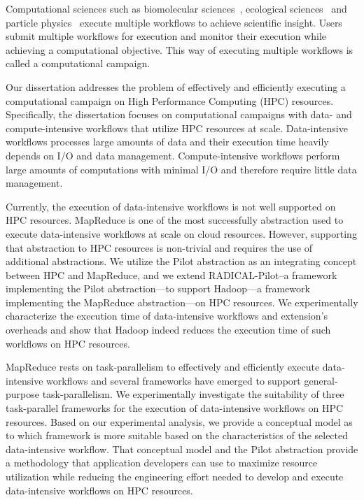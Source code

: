 Computational sciences such as biomolecular sciences~\cite{cheatham2015impact,
dakka2018concurrent}, ecological sciences~\cite{goncalves2020sealnet,
paraskevakos2019workflow} and particle physics~\cite{atlas} execute multiple
workflows to achieve scientific insight. Users submit multiple workflows for
execution and monitor their execution while achieving a computational objective.
This way of executing multiple workflows is called a computational campaign.

Our dissertation addresses the problem of effectively and efficiently executing
a computational campaign on High Performance Computing (HPC) resources.
Specifically, the dissertation focuses on computational campaigns with data- and
compute-intensive workflows that utilize HPC resources at scale. Data-intensive
workflows processes large amounts of data and their execution time heavily
depends on I/O and data management. Compute-intensive workflows perform large
amounts of computations with minimal I/O and therefore require little data
management.

Currently, the execution of data-intensive workflows is not well supported on
HPC resources. MapReduce is one of the most successfully abstraction used to
execute data-intensive workflows at scale on cloud resources. However,
supporting that abstraction to HPC resources is non-trivial and requires the
use of additional abstractions. We utilize the Pilot abstraction as an
integrating concept between HPC and MapReduce, and we extend RADICAL-Pilot--a
framework implementing the Pilot abstraction---to support Hadoop---a framework
implementing the MapReduce abstraction---on HPC resources. We experimentally
characterize the execution time of data-intensive workflows and extension's
overheads and show that Hadoop indeed reduces the execution time of such
workflows on HPC resources.


MapReduce rests on task-parallelism to effectively and efficiently execute
data-intensive workflows and several frameworks have emerged to support
general-purpose task-parallelism. We experimentally investigate the suitability
of three task-parallel frameworks for the execution of data-intensive workflows
on HPC resources. Based on our experimental analysis, we provide a conceptual
model as to which framework is more suitable based on the characteristics of the
selected data-intensive workflow. That conceptual model and the Pilot
abstraction provide a methodology that application developers can use to
maximize resource utilization while reducing the engineering effort needed to
develop and execute data-intensive workflows on HPC resources.

